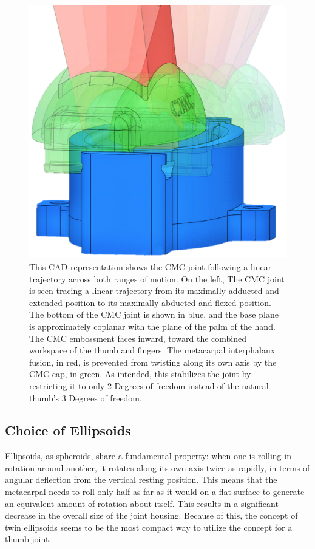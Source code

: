 \documentclass[letterpaper, 10 pt, conference]{ieeeconf}  %
\begin{document}
\begin{figure}
	\centering
	\includegraphics[width = 1\columnwidth]{cmcgraphic}
	\caption{This CAD representation shows the CMC joint following a linear trajectory across both ranges of motion. On the left, The CMC joint is seen tracing a linear trajectory from its maximally adducted and extended position to its maximally abducted and flexed position. The bottom of the CMC joint is shown in blue, and the base plane is approximately coplanar with the plane of the palm of the hand. The CMC embossment faces inward, toward the combined workspace of the thumb and fingers. The metacarpal interphalanx fusion, in red, is prevented from twisting along its own axis by the CMC cap, in green. As intended, this stabilizes the joint by restricting it to only 2 Degrees of freedom instead of the natural thumb's 3 Degrees of freedom.}\label{cmcgraphi}
	\vspace{-15pt}
\end{figure}

\subsection{Choice of Ellipsoids}

Ellipsoids, as spheroids, share a fundamental property: when one is rolling in rotation around another, it rotates along its own axis twice as rapidly, in terms of angular deflection from the vertical resting position. This means that the metacarpal needs to roll only half as far as it would on a flat surface to generate an equivalent amount of rotation about itself. This results in a significant decrease in the overall size of the joint housing. Because of this, the concept of twin ellipsoids seems to be the most compact way to utilize the concept for a thumb joint.
\end{document}
